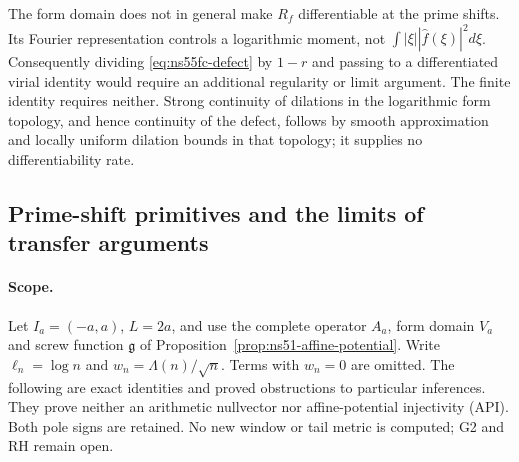 The form domain does not in general make $R_f$ differentiable at the
prime shifts. Its Fourier representation controls a logarithmic moment,
not $\int|\xi||\widehat f(\xi)|^2d\xi$. Consequently dividing
\eqref{eq:ns55fc-defect} by $1-r$ and passing to a differentiated
virial identity would require an additional regularity or limit
argument. The finite identity requires neither. Strong continuity of
dilations in the logarithmic form topology, and hence continuity of
the defect, follows by smooth approximation and locally uniform
dilation bounds in that topology; it supplies no differentiability rate.


\subsection*{Prime-shift primitives and the limits of transfer arguments}

\paragraph{Scope.}
Let $I_a=(-a,a)$, $L=2a$, and use the complete operator $A_a$,
form domain $V_a$ and screw function $\mathfrak g$ of
Proposition~\ref{prop:ns51-affine-potential}. Write
$\ell_n=\log n$ and $w_n=\Lambda(n)/\sqrt n$. Terms with
$w_n=0$ are omitted. The following are exact identities and proved
obstructions to particular inferences. They prove neither an arithmetic
nullvector nor affine-potential injectivity (API). Both pole signs are
retained. No new window or tail metric is computed; G2 and RH remain open.

